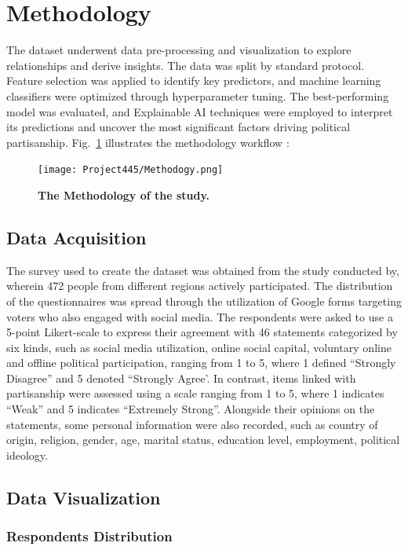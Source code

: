 \documentclass[pt]{article}  %
\begin{document}
\section{Methodology}
The dataset underwent data pre-processing and visualization to explore relationships and derive insights. The data was split by standard protocol. Feature selection was applied to identify key predictors, and machine learning classifiers were optimized through hyperparameter tuning. The best-performing model was evaluated, and Explainable AI techniques were employed to interpret its predictions and uncover the most significant factors driving political partisanship. Fig.~\ref{fig:figure2} illustrates the methodology workflow :

\begin{figure}[H]
    \centering
    \texttt{[image: Project445/Methodogy.png]} %
    \caption{\textbf{The Methodology of the study.}}
    \label{fig:figure2} 
\end{figure}


\subsection{\textbf{Data Acquisition }}The survey used to create the dataset was obtained from the study conducted by\cite{ref4}, wherein 472 people from different regions actively participated. The distribution of the questionnaires was spread through the utilization of Google forms targeting voters who also engaged with social media. The respondents were asked to use a 5-point Likert-scale to express their agreement with 46 statements categorized by six kinds, such as social media utilization, online social capital, voluntary online and offline political participation, ranging from 1 to 5, where 1 defined “Strongly Disagree” and 5 denoted “Strongly Agree’. In contrast, items linked with partisanship were assessed using a scale ranging from 1 to 5, where 1 indicates “Weak” and 5 indicates “Extremely Strong”. Alongside their opinions on the statements, some personal information were also recorded, such as country of origin, religion, gender, age, marital status, education level, employment, political ideology.

\subsection{Data Visualization}

\subsubsection{Respondents Distribution}
\end{document}
